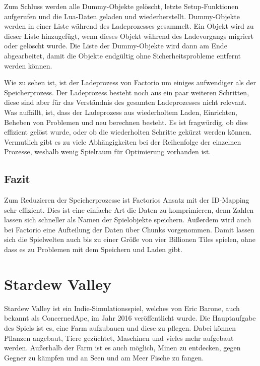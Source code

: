 Zum Schluss werden alle Dummy-Objekte gelöscht, letzte Setup-Funktionen aufgerufen und die Lua-Daten geladen und wiederherstellt. Dummy-Objekte werden in einer Liste während des Ladeprozesses gesammelt. Ein Objekt wird zu dieser Liste hinzugefügt, wenn dieses Objekt während des Ladevorgangs migriert oder gelöscht wurde. Die Liste der Dummy-Objekte wird dann am Ende abgearbeitet, damit die Objekte endgültig ohne Sicherheitsprobleme entfernt werden können.\cite{factorioGithubSaveLoad}

Wie zu sehen ist, ist der Ladeprozess von Factorio um einiges aufwendiger als der Speicherprozess. Der Ladeprozess besteht noch aus ein paar weiteren Schritten, diese sind aber für das Verständnis des gesamten Ladeprozesses nicht relevant. Was auffällt, ist, dass der Ladeprozess aus wiederholtem Laden, Einrichten, Beheben von Problemen und neu berechnen besteht. Es ist fragwürdig, ob dies effizient gelöst wurde, oder ob die wiederholten Schritte gekürzt werden können. Vermutlich gibt es zu viele Abhängigkeiten bei der Reihenfolge der einzelnen Prozesse, weshalb wenig Spielraum für Optimierung vorhanden ist.



\subsection{Fazit}
Zum Reduzieren der Speicherprozesse ist Factorios Ansatz mit der ID-Mapping sehr effizient. Dies ist eine einfache Art die Daten zu komprimieren, denn Zahlen lassen sich schneller als Namen der Spielobjekte speichern. Außerdem wird auch bei Factorio eine Aufteilung der Daten über Chunks vorgenommen. Damit lassen sich die Spielwelten auch bis zu einer Größe von vier Billionen Tiles spielen, ohne dass es zu Problemen mit dem Speichern und Laden gibt.



\section{Stardew Valley}
Stardew Valley ist ein Indie-Simulationsspiel, welches von Eric Barone, auch bekannt als ConcernedApe, im Jahr 2016 veröffentlicht wurde. Die Hauptaufgabe des Spiels ist es, eine Farm aufzubauen und diese zu pflegen. Dabei können Pflanzen angebaut, Tiere gezüchtet, Maschinen und vieles mehr aufgebaut werden. Außerhalb der Farm ist es auch möglich, Minen zu entdecken, gegen Gegner zu kämpfen und an Seen und am Meer Fische zu fangen.\cite{steampoweredStardewValley} 

